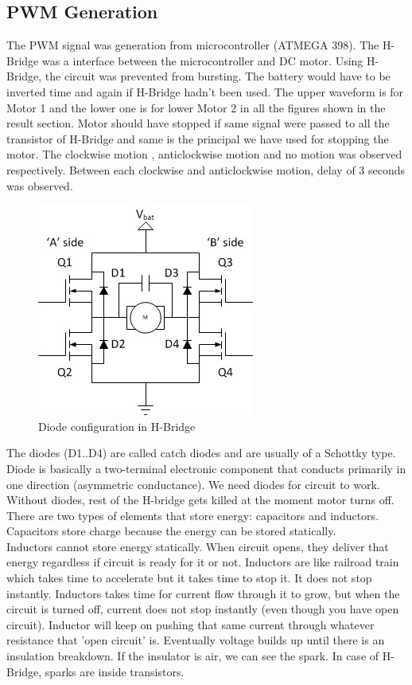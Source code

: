 \subsection{PWM Generation}
The PWM signal was generation from microcontroller (ATMEGA 398). The H-Bridge was a interface between the microcontroller and DC motor. Using H-Bridge, the circuit was prevented from bursting. The battery would have to be inverted time and again if H-Bridge hadn't been used. The upper waveform is for Motor 1 and the lower one is for lower Motor 2 in all the figures shown in the result section. Motor should have stopped if same signal were passed to all the transistor of H-Bridge and same is the principal we have used for stopping the motor. The clockwise motion , anticlockwise motion and no motion was observed respectively. Between each clockwise and anticlockwise motion, delay of 3 seconds was observed.\\
\begin{figure}[h]
\center
\includegraphics[scale=1]{hbridge.jpg} 
\caption{Diode configuration in H-Bridge}
\end{figure}
\justify The diodes (D1..D4) are called catch diodes and are usually of a Schottky type. Diode is basically a two-terminal electronic component that conducts primarily in one direction (asymmetric conductance). We need diodes for circuit to work. Without diodes, rest of the H-bridge gets killed at the moment motor turns off.\\
There are two types of elements that store energy: capacitors and inductors. Capacitors store charge because the energy can be stored statically.\\
Inductors cannot store energy statically. When circuit opens, they deliver that energy regardless if circuit is ready for it or not. Inductors are like railroad train which takes time to accelerate but it takes time to stop it. It does not stop instantly.  Inductors takes time for current flow through it to grow, but when the circuit is turned off, current does not stop instantly (even though you have open circuit). Inductor will keep on pushing that same current through whatever resistance that 'open circuit' is. Eventually voltage builds up until there is an insulation breakdown. If the insulator is air, we can see the spark. In case of H-Bridge, sparks are inside transistors.\\
